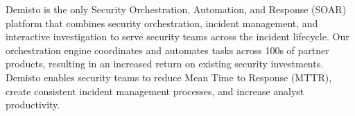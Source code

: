 Demisto is the only Security Orchestration, Automation, and Response (SOAR) platform that combines security orchestration, incident management, and interactive investigation to serve security teams across the incident lifecycle. Our orchestration engine coordinates and automates tasks across 100s of partner products, resulting in an increased return on existing security investments. Demisto enables security teams to reduce Mean Time to Response (MTTR), create consistent incident management processes, and increase analyst productivity.